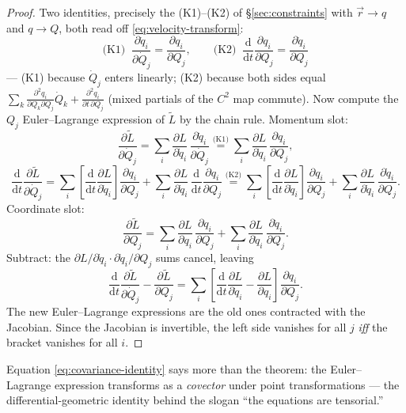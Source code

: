 \documentclass[11pt]{article}
\theoremstyle{plain}
\theoremstyle{definition}
\theoremstyle{remark}
\newcommand{\dd}{\mathrm{d}}
\newcommand{\pd}[2]{\frac{\partial #1}{\partial #2}}
\newcommand{\vr}{\vec{r}}
\begin{document}
\begin{proof}
Two identities, precisely the (K1)--(K2) of \S\ref{sec:constraints} with
$\vr \to q$ and $q \to Q$, both read off \eqref{eq:velocity-transform}:
\begin{equation}
  \text{(K1)}\;\; \pd{\dot q_i}{\dot Q_j} = \pd{q_i}{Q_j},
  \qquad
  \text{(K2)}\;\; \frac{\dd}{\dd t}\pd{q_i}{Q_j} = \pd{\dot q_i}{Q_j}
\end{equation}
--- (K1) because $\dot Q_j$ enters linearly; (K2) because both sides equal
$\sum_k \frac{\partial^2 q_i}{\partial Q_k \partial Q_j}\dot Q_k
+ \frac{\partial^2 q_i}{\partial t\,\partial Q_j}$ (mixed partials of the
$C^2$ map commute). Now compute the $Q_j$ Euler--Lagrange expression of
$\widetilde L$ by the chain rule. Momentum slot:
\begin{equation}
  \pd{\widetilde L}{\dot Q_j}
  = \sum_i \pd{L}{\dot q_i}\,\pd{\dot q_i}{\dot Q_j}
  \overset{\text{(K1)}}{=}
  \sum_i \pd{L}{\dot q_i}\,\pd{q_i}{Q_j} ,
\end{equation}
\begin{equation}
  \frac{\dd}{\dd t}\pd{\widetilde L}{\dot Q_j}
  = \sum_i \left[\frac{\dd}{\dd t}\pd{L}{\dot q_i}\right]\pd{q_i}{Q_j}
  + \sum_i \pd{L}{\dot q_i}\,\frac{\dd}{\dd t}\pd{q_i}{Q_j}
  \overset{\text{(K2)}}{=}
  \sum_i \left[\frac{\dd}{\dd t}\pd{L}{\dot q_i}\right]\pd{q_i}{Q_j}
  + \sum_i \pd{L}{\dot q_i}\,\pd{\dot q_i}{Q_j} .
\end{equation}
Coordinate slot:
\begin{equation}
  \pd{\widetilde L}{Q_j}
  = \sum_i \pd{L}{q_i}\,\pd{q_i}{Q_j}
  + \sum_i \pd{L}{\dot q_i}\,\pd{\dot q_i}{Q_j} .
\end{equation}
Subtract: the $\partial L/\partial\dot q_i \cdot
\partial\dot q_i/\partial Q_j$ sums cancel, leaving
\begin{equation}
  \frac{\dd}{\dd t}\pd{\widetilde L}{\dot Q_j} - \pd{\widetilde L}{Q_j}
  = \sum_i \left[\frac{\dd}{\dd t}\pd{L}{\dot q_i} - \pd{L}{q_i}\right]
  \pd{q_i}{Q_j} .
  \label{eq:covariance-identity}
\end{equation}
The new Euler--Lagrange expressions are the old ones contracted with the
Jacobian. Since the Jacobian is invertible, the left side vanishes for all
$j$ \emph{iff} the bracket vanishes for all $i$.
\end{proof}

Equation \eqref{eq:covariance-identity} says more than the theorem: the
Euler--Lagrange expression transforms as a \emph{covector} under point
transformations --- the differential-geometric identity behind the slogan
``the equations are tensorial.''
\end{document}
